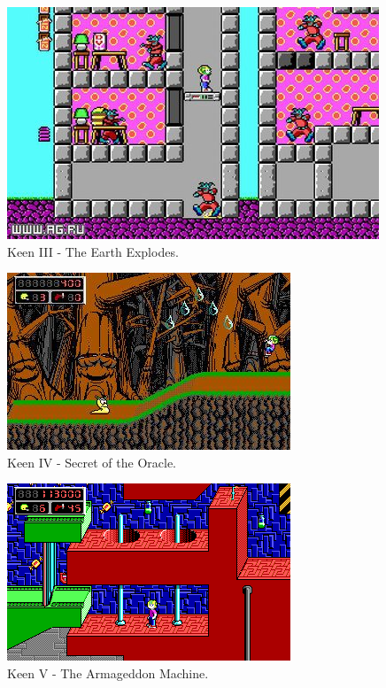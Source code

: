 \documentclass[book.tex]{subfiles}
\begin{document}
\begin{figure}[H]
  \centering
  \includegraphics[width=.95\textwidth]{screenshots_300dpi/keen1_3.jpg}
  \caption{Keen III - The Earth Explodes.}
\label{fig:keen_1}
\end{figure}




\begin{figure}[H]
  \centering
  \includegraphics[width=.95\textwidth]{screenshots_300dpi/keen2_1.jpg}
  \caption{Keen IV - Secret of the Oracle.}
\label{fig:keen_1}
\end{figure}

\begin{figure}[H]
  \centering
  \includegraphics[width=.95\textwidth]{screenshots_300dpi/keen2_2.png}
  \caption{Keen V - The Armageddon Machine.}
\label{fig:keen_1}
\end{figure}
\end{document}
